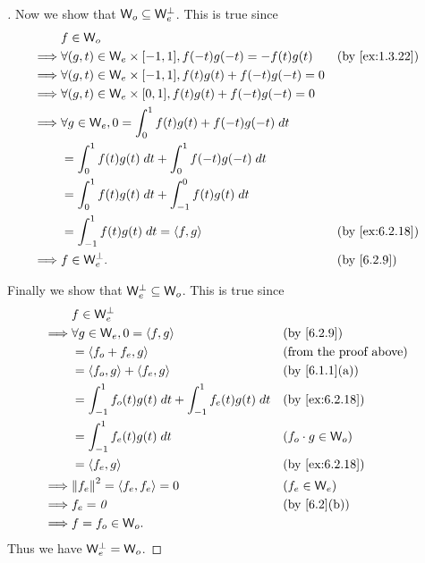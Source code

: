 \begin{proof}[]
  Now we show that \(\mathsf{W}_o \subseteq \mathsf{W}_e^{\perp}\).
  This is true since
  \begin{align*}
             & f \in \W_o                                                                              \\
    \implies & \forall (g, t) \in \W_e \times [-1, 1], f(-t) g(-t) = -f(t) g(t)    &  & \by{ex:1.3.22} \\
    \implies & \forall (g, t) \in \W_e \times [-1, 1], f(t) g(t) + f(-t) g(-t) = 0                     \\
    \implies & \forall (g, t) \in \W_e \times [0, 1], f(t) g(t) + f(-t) g(-t) = 0                      \\
    \implies & \forall g \in \W_e, 0 = \int_0^1 f(t) g(t) + f(-t) g(-t) \; dt                          \\
             & = \int_0^1 f(t) g(t) \; dt + \int_0^1 f(-t) g(-t) \; dt                                 \\
             & = \int_0^1 f(t) g(t) \; dt + \int_{-1}^0 f(t) g(t) \; dt                                \\
             & = \int_{-1}^1 f(t) g(t) \; dt = \inn{f, g}                          &  & \by{ex:6.2.18} \\
    \implies & f \in \W_e^{\perp}.                                                 &  & \by{6.2.9}
  \end{align*}

  Finally we show that \(\mathsf{W}_e^{\perp} \subseteq \mathsf{W}_o\).
  This is true since
  \begin{align*}
             & f \in \W_e^{\perp}                                                                                 \\
    \implies & \forall g \in \W_e, 0 = \inn{f, g}                              &  & \by{6.2.9}                    \\
             & = \inn{f_o + f_e, g}                                            &  & \text{(from the proof above)} \\
             & = \inn{f_o, g} + \inn{f_e, g}                                   &  & \by{6.1.1}[a]                 \\
             & = \int_{-1}^1 f_o(t) g(t) \; dt + \int_{-1}^1 f_e(t) g(t) \; dt &  & \by{ex:6.2.18}                \\
             & = \int_{-1}^1 f_e(t) g(t) \; dt                                 &  & (f_o \cdot g \in \W_o)        \\
             & = \inn{f_e, g}                                                  &  & \by{ex:6.2.18}                \\
    \implies & \norm{f_e}^2 = \inn{f_e, f_e} = 0                               &  & (f_e \in \W_e)                \\
    \implies & f_e = \zv                                                       &  & \by{6.2}[b]                   \\
    \implies & f = f_o \in \W_o.
  \end{align*}
  Thus we have \(\mathsf{W}_e^{\perp} = \mathsf{W}_o\).
\end{proof}

